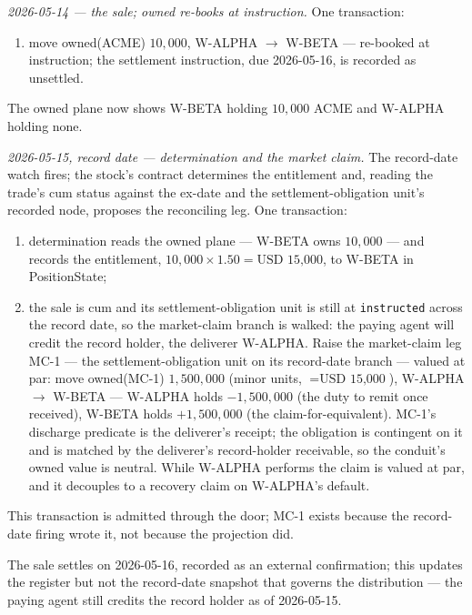 \documentclass[11pt,a4paper]{article}
\newcommand{\USD}[1]{\mbox{USD~#1}}
\begin{document}
\emph{2026-05-14 --- the sale; owned re-books at instruction.} One transaction:
\begin{enumerate}[label=(\arabic*),nosep]
\item move owned(ACME) $10{,}000$, W-ALPHA $\to$ W-BETA --- re-booked at
instruction; the settlement instruction, due 2026-05-16, is recorded as unsettled.
\end{enumerate}
The owned plane now shows W-BETA holding $10{,}000$ ACME and W-ALPHA holding none.

\emph{2026-05-15, record date --- determination and the market claim.} The
record-date watch fires; the stock's contract determines the entitlement and, reading
the trade's cum status against the ex-date and the settlement-obligation unit's recorded
node, proposes the reconciling leg. One transaction:
\begin{enumerate}[label=(\arabic*),nosep]
\item determination reads the owned plane --- W-BETA owns $10{,}000$ --- and records
the entitlement, $10{,}000 \times 1.50 = \USD{15{,}000}$, to W-BETA in PositionState;
\item the sale is cum and its settlement-obligation unit is still at \texttt{instructed}
across the record date, so the market-claim branch is walked: the paying agent will credit
the record holder, the deliverer W-ALPHA. Raise the market-claim leg MC-1 --- the
settlement-obligation unit on its record-date branch ---
valued at par: move owned(MC-1) $1{,}500{,}000$ (minor units, $=\USD{15{,}000}$),
W-ALPHA $\to$ W-BETA --- W-ALPHA holds $-1{,}500{,}000$ (the duty to remit once
received), W-BETA holds $+1{,}500{,}000$ (the claim-for-equivalent). MC-1's discharge
predicate is the deliverer's receipt; the obligation is contingent on it and is
matched by the deliverer's record-holder receivable, so the conduit's owned value is
neutral. While W-ALPHA performs the claim is valued at par, and it decouples to a
recovery claim on W-ALPHA's default.
\end{enumerate}
This transaction is admitted through the door; MC-1 exists because the record-date
firing wrote it, not because the projection did.

The sale settles on 2026-05-16, recorded as an external confirmation; this updates
the register but not the record-date snapshot that governs the distribution --- the
paying agent still credits the record holder as of 2026-05-15.
\end{document}
